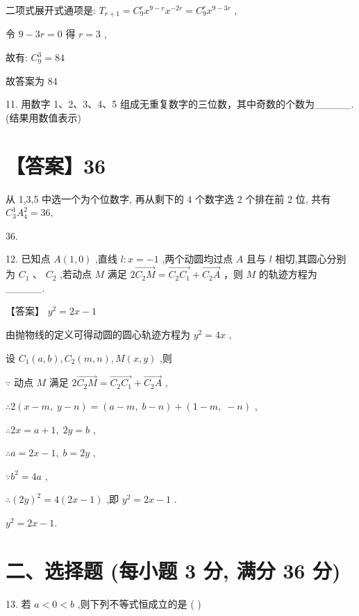\documentclass[10pt]{article}
\begin{document}
二项式展开式通项是: \({T}_{r + 1} = {C}_{9}^{r}{x}^{9 - r}{x}^{-{2r}} = {C}_{9}^{r}{x}^{9 - {3r}}\) ,

令 \(9 - {3r} = 0\) 得 \(r = 3\) ,

故有: \({C}_{9}^{3} = {84}\)

故答案为 84

11. 用数字 1、2、3、4、5 组成无重复数字的三位数，其中奇数的个数为\_\_\_\_\_. (结果用数值表示)

\section*{【答案】36}

从 1,3,5 中选一个为个位数字, 再从剩下的 4 个数字选 2 个排在前 2 位, 共有 \({C}_{3}^{1}{A}_{4}^{2} = {36},\)

36.

12. 已知点 \(A\left( {1,0}\right)\) ,直线 \(l : x =  - 1\) ,两个动圆均过点 \(A\) 且与 \(l\) 相切,其圆心分别为 \({C}_{1}\text{ 、 }{C}_{2}\) ,若动点 \(M\) 满足 \(2\overrightarrow{{C}_{2}M} = \overrightarrow{{C}_{2}{C}_{1}} + \overrightarrow{{C}_{2}A}\) ，则 \(M\) 的轨迹方程为\_\_\_\_\_.

【答案】 \({y}^{2} = {2x} - 1\)

由抛物线的定义可得动圆的圆心轨迹方程为 \({y}^{2} = {4x}\) ,

设 \({C}_{1}\left( {a,b}\right) ,{C}_{2}\left( {m,n}\right) ,M\left( {x,y}\right)\) ,则

\(\because\) 动点 \(M\) 满足 \(2\overrightarrow{{C}_{2}M} = \overrightarrow{{C}_{2}{C}_{1}} + \overrightarrow{{C}_{2}A}\) ,

\(\therefore 2\left( {x - m,\;y - n}\right)  = \left( {a - m,\;b - n}\right)  + \left( {1 - m,\; - n}\right)\) ,

\(\therefore {2x} = a + 1,\;{2y} = b\) ,

\(\therefore a = {2x} - 1,\;b = {2y}\) ,

\(\because {b}^{2} = {4a}\) ,

\(\therefore {\left( 2y\right) }^{2} = 4\left( {{2x} - 1}\right)\) ,即 \({y}^{2} = {2x} - 1\) .

\({y}^{2} = {2x} - 1.\)

\section*{二、选择题 (每小题 3 分, 满分 36 分)}

13. 若 \(a < 0 < b\) ,则下列不等式恒成立的是 ( )
\end{document}
